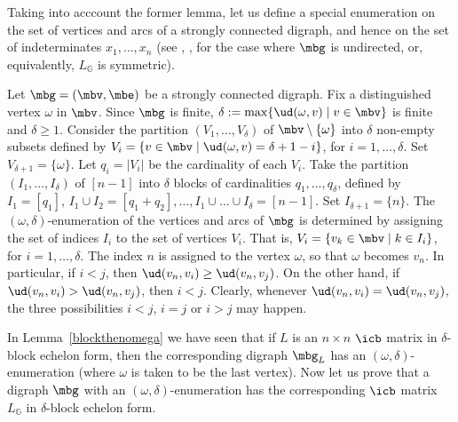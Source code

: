  Taking into acccount the former lemma, let us define a
special enumeration on the set of vertices and arcs of a strongly
connected digraph, and hence on the set of indeterminates $x_1,\ldots
,x_n$ (see \cite[p.~7]{crs}, \cite[Section~2.2.3]{mos}, for the case
where $\mbg$ is undirected, or, equivalently, $L_{\mathbb{G}}$ is
symmetric).

\begin{definition}\label{def-omega}
Let $\mbg=(\mbv,\mbe)$ be a strongly connected digraph.  Fix a
distinguished vertex $\omega$ in $\mbv$. Since $\mbg$ is finite,
$\delta:=\max\{\ud(\omega,v)\mid v\in \mbv\}$ is finite and
$\delta\geq 1$. Consider the partition $(V_1,\ldots ,V_{\delta})$ of
$\mbv\setminus\{\omega\}$ into $\delta$ non-empty subsets defined by
$V_i=\{v\in \mbv\mid \ud(\omega,v)=\delta+1-i\}$, for $i=1,\ldots
,\delta$. Set $V_{\delta+1}=\{\omega\}$.  Let $q_i=\lvert V_i\rvert$
be the cardinality of each $V_i$. Take the partition $(I_1,\ldots
,I_\delta)$ of $[n-1]$ into $\delta$ blocks of cardinalities
$q_1,\ldots ,q_\delta$, defined by $I_1=[q_1]$, $I_1\cup
I_2=[q_1+q_2],\ldots ,I_1\cup\ldots\cup I_\delta=[n-1]$. Set
$I_{\delta+1}=\{n\}$. The $(\omega,\delta)$-enumeration of the
vertices and arcs of $\mbg$ is determined by assigning the set of
indices $I_i$ to the set of vertices $V_i$.  That is, $V_i=\{v_k\in
\mbv\mid k\in I_i\}$, for $i=1,\ldots ,\delta$. The index $n$ is
assigned to the vertex $\omega$, so that $\omega$ becomes $v_n$. In
particular, if $i<j$, then $\ud(v_n,v_i)\geq \ud(v_n,v_j)$. On the
other hand, if $\ud(v_n,v_i)>\ud(v_n,v_j)$, then $i<j$. Clearly,
whenever $\ud(v_n,v_i)=\ud(v_n,v_j)$, the three possibilities $i<j$,
$i=j$ or $i>j$ may happen.
\end{definition}

In Lemma~\ref{blockthenomega} we have seen that if $L$ is an $n\times
n$ $\icb$ matrix in $\delta$-block echelon form, then the
corresponding digraph $\mbg_L$ has an $(\omega,\delta)$-enumeration
(where $\omega$ is taken to be the last vertex). Now let us prove that
a digraph $\mbg$ with an $(\omega,\delta)$-enumeration has the
corresponding $\icb$ matrix $L_{\mathbb{G}}$ in $\delta$-block echelon
form.

